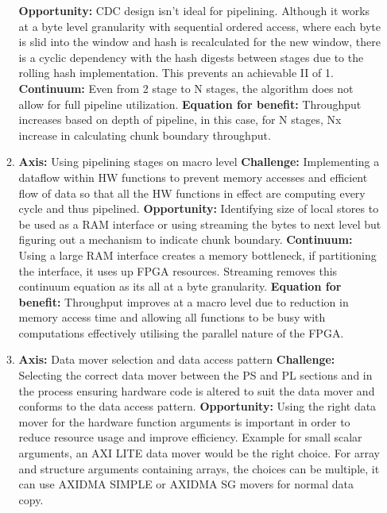 \documentclass{article}
\begin{document}
\begin{enumerate}
\begin{enumerate}
\newline
\textbf{Opportunity:} CDC design isn't ideal for pipelining. Although it works at a byte level granularity with sequential ordered access, where each byte is slid into the window and hash is recalculated for the new window, there is a cyclic dependency with the hash digests between stages due to the rolling hash implementation. This prevents an achievable II of 1. 
\newline
\textbf{Continuum:} Even from 2 stage to N stages, the algorithm does not allow for full pipeline utilization.
\newline
\textbf{Equation for benefit:} Throughput increases based on depth of pipeline, in this case, for N stages, Nx increase in calculating chunk boundary throughput.
\item%
\textbf{Axis:} Using pipelining stages on macro level
\newline
\textbf{Challenge:} Implementing a dataflow within HW functions to prevent memory accesses and efficient flow of data so that all the HW functions in effect are computing every cycle and thus pipelined.
\newline
\textbf{Opportunity:} Identifying size of local stores to be used as a RAM interface or using streaming the bytes to next level but figuring out a mechanism to indicate chunk boundary. 
\newline
\textbf{Continuum:} Using a large RAM interface creates a memory bottleneck, if partitioning the interface, it uses up FPGA resources.
Streaming removes this continuum equation as its all at a byte granularity.
\newline
\textbf{Equation for benefit: } Throughput improves at a macro level due to reduction in memory access time and allowing all functions to be busy with computations effectively utilising the parallel nature of the FPGA.
\item%
\textbf{Axis:} Data mover selection and data access pattern
\newline
\textbf{Challenge:} Selecting the correct data mover between the PS and PL sections and in the process ensuring hardware code is altered to suit the data mover and conforms to the data access pattern. 
\newline
\textbf{Opportunity:} Using the right data mover for the hardware function arguments is important in order to reduce resource usage and improve efficiency. Example for small scalar arguments, an AXI LITE data mover would be the right choice.
For array and structure arguments containing arrays, the choices can be multiple, it can use AXIDMA SIMPLE or AXIDMA SG movers for normal data copy. 

\end{enumerate}
\end{enumerate}
\end{document}
